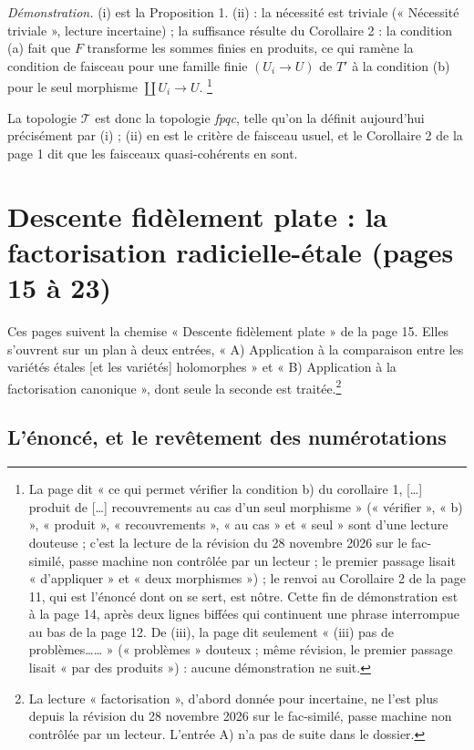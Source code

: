\documentclass[11pt,a4paper]{article}
\begin{document}
\emph{Démonstration.} (i) est la Proposition 1. (ii) : la nécessité est
triviale (« Nécessité triviale », lecture incertaine) ; la suffisance résulte du Corollaire 2 :
la condition (a) fait que $F$ transforme les sommes finies en produits, ce
qui ramène la condition de faisceau pour une famille finie $(U_i \to U)$ de
$T'$ à la condition (b) pour le seul morphisme $\coprod U_i \to U$.%
\footnote{La page dit « ce qui permet vérifier la condition b) du
corollaire 1, […] produit de […] recouvrements au cas d'un seul morphisme »
(« vérifier », « b) », « produit », « recouvrements », « au cas » et « seul »
sont d'une lecture douteuse ; c'est la lecture de la révision du 28 novembre 2026 sur le fac-similé, passe machine non contrôlée par un lecteur ; le premier passage
lisait « d'appliquer » et « deux morphismes ») ; le renvoi au
Corollaire 2 de la page 11, qui est l'énoncé dont on se sert, est nôtre. Cette fin de démonstration est à la page 14, après deux lignes
biffées qui continuent une phrase interrompue au bas de la page 12. De
(iii), la page dit seulement « (iii) pas de problèmes…… » (« problèmes » douteux ;
même révision, le premier passage lisait « par des produits ») : aucune
démonstration ne suit.}

La topologie $\mathcal{T}$ est donc la topologie \emph{fpqc}, telle qu'on la
définit aujourd'hui précisément par (i) ; (ii) en est le critère de faisceau
usuel, et le Corollaire 2 de la page 1 dit que les faisceaux quasi-cohérents
en sont.

\section*{Descente fidèlement plate : la factorisation radicielle-étale (pages 15 à 23)}

Ces pages suivent la chemise « Descente fidèlement plate » de la page 15. Elles
s'ouvrent sur un plan à deux entrées, « A) Application à la comparaison entre
les variétés étales [et les variétés] holomorphes » et « B) Application à la
factorisation canonique », dont seule la seconde est traitée.\footnote{La
lecture « factorisation », d'abord donnée pour incertaine, ne l'est plus depuis
la révision du 28 novembre 2026 sur le fac-similé, passe machine non contrôlée par un lecteur. L'entrée
A) n'a pas de suite dans le dossier.}

\subsection*{L'énoncé, et le revêtement des numérotations}
\end{document}
